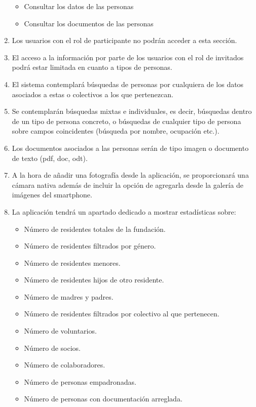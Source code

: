 \begin{enumerate}[start=9,label={RF-\arabic*.}]
\begin{itemize}
            \item Consultar los datos de las personas
            \item Consultar los documentos de las personas
        \end{itemize}
    \item Los usuarios con el rol de participante no podrán acceder a esta sección.
    \item El acceso a la información por parte de los usuarios con el rol de invitados podrá estar limitada en cuanto a tipos de personas.
    \item El sistema contemplará búsquedas de personas por cualquiera de los datos asociados a estas o colectivos a los que pertenezcan.
    \item Se contemplarán búsquedas mixtas e individuales, es decir, búsquedas dentro de un tipo de persona concreto, o búsquedas de cualquier tipo de persona sobre campos coincidentes (búsqueda por nombre, ocupación etc.).
    \item Los documentos asociados a las personas serán de tipo imagen o documento de texto (pdf, doc, odt).
    \item A la hora de añadir una fotografía desde la aplicación, se proporcionará una cámara nativa además de incluir la opción de agregarla desde la galería de imágenes del smartphone.
    \item \label{rf-es-personas} La aplicación tendrá un apartado dedicado a mostrar estadísticas sobre:
        \begin{itemize}
            \item Número de residentes totales de la fundación.
            \item Número de residentes filtrados por género.
            \item Número de residentes menores.
            \item Número de residentes hijos de otro residente.
            \item Número de madres y padres.
            \item Número de residentes filtrados por colectivo al que pertenecen.
            \item Número de voluntarios.
            \item Número de socios.
            \item Número de colaboradores.
            \item Número de personas empadronadas.
            \item Número de personas con documentación arreglada.

\end{itemize}
\end{enumerate}
